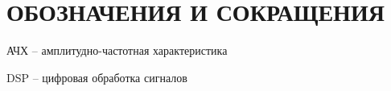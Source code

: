 \section*{ОБОЗНАЧЕНИЯ И СОКРАЩЕНИЯ}

АЧХ -- амплитудно-частотная характеристика

DSP -- цифровая обработка сигналов